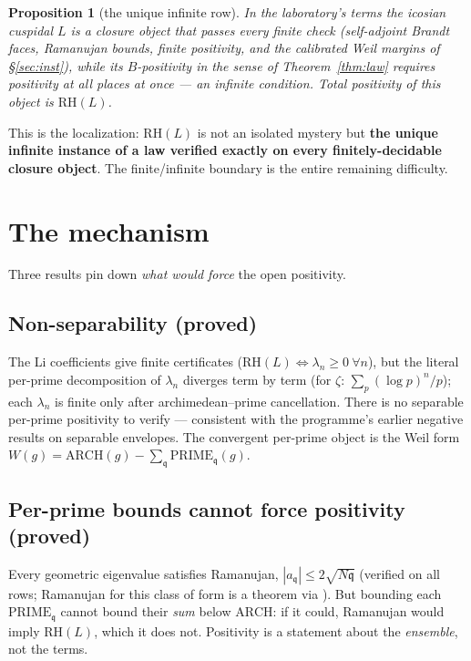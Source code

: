 \documentclass[11pt]{article}
\newtheorem{proposition}[theorem]{Proposition}
\theoremstyle{remark}
\newcommand{\RH}{\mathrm{RH}}
\begin{document}
\begin{proposition}[the unique infinite row]\label{prop:row}
In the laboratory's terms the icosian cuspidal $L$ is a closure object that passes
every finite check (self-adjoint Brandt faces, Ramanujan bounds, finite positivity,
and the calibrated Weil margins of \S\ref{sec:inst}), while its $B$-positivity in
the sense of Theorem~\ref{thm:law} requires positivity \emph{at all places at once}
--- an infinite condition. Total positivity of this object \emph{is} $\RH(L)$.
\end{proposition}

This is the localization: $\RH(L)$ is not an isolated mystery but \textbf{the unique
infinite instance of a law verified exactly on every finitely-decidable closure
object}. The finite/infinite boundary is the entire remaining difficulty.

\section{The mechanism}\label{sec:mech}

Three results pin down \emph{what would force} the open positivity.

\subsection{Non-separability (proved)}
The Li coefficients \cite{Li97,BL99} give finite certificates
($\RH(L) \iff \lambda_n \ge 0\ \forall n$), but the literal per-prime decomposition of
$\lambda_n$ diverges term by term (for $\zeta$: $\sum_p (\log p)^n/p$); each
$\lambda_n$ is finite only after archimedean--prime cancellation. There is no
separable per-prime positivity to verify --- consistent with the programme's earlier
negative results on separable envelopes. The convergent per-prime object is the Weil
form \cite{Weil52} $W(g) = \mathrm{ARCH}(g) - \sum_{\mathfrak q}
\mathrm{PRIME}_{\mathfrak q}(g)$.

\subsection{Per-prime bounds cannot force positivity (proved)}
Every geometric eigenvalue satisfies Ramanujan,
$|a_{\mathfrak q}| \le 2\sqrt{N\mathfrak q}$ (verified on all rows; Ramanujan for
this class of form is a theorem via \cite{Blasius}). But bounding each
$\mathrm{PRIME}_{\mathfrak q}$ cannot bound their \emph{sum} below
$\mathrm{ARCH}$: if it could, Ramanujan would imply $\RH(L)$, which it does not.
Positivity is a statement about the \emph{ensemble}, not the terms.
\end{document}
